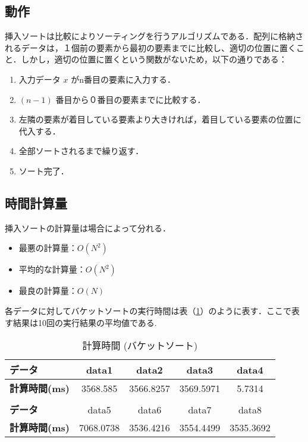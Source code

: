 \documentclass[a4j, titlepage]{jarticle}
\begin{document}
        \subsection{動作}
            挿入ソートは比較によりソーティングを行うアルゴリズムである．配列に格納されるデータは，１個前の要素から最初の要素までに比較し、適切の位置に置くこと．しかし，適切の位置に置くという関数がないため，以下の通りである：
            
            \begin{enumerate}
                \item 入力データ $x$ がn番目の要素に入力する．
                \item $(n-1)$ 番目から０番目の要素までに比較する．
                \item 左隣の要素が着目している要素より大きければ，着目している要素の位置に代入する．
                \item 全部ソートされるまで繰り返す．
                \item ソート完了．
            \end{enumerate}
        
        \subsection{時間計算量}
            挿入ソートの計算量は場合によって分れる．
            \begin{itemize}
                \item 最悪の計算量：$O(N^2)$
                \item 平均的な計算量：$O(N^2)$
                \item 最良の計算量：$O(N)$
            \end{itemize}

            各データに対してバケットソートの実行時間は表（\ref{tab:insertion}）のように表す．ここで表す結果は10回の実行結果の平均値である.

            \begin{table}[tbh]
                \caption{計算時間 (バケットソート)}
                \label{tab:insertion}
                \begin{center}
                    \begin{tabular}{lcccc}
                        \hline
                        \textbf{データ} & data1 & data2 &data3 &data4 \\ \hline
                        \textbf{計算時間(ms)} & 3568.585 & 3566.8257 & 3569.5971 & 5.7314\\ \hline
                        \\ \hline
                        \textbf{データ} & data5 &data6 &data7 &data8\\ \hline
                        \textbf{計算時間(ms)} &7068.0738 & 3536.4216 & 3554.4499 & 3535.3692\\ \hline
                    \end{tabular}
                \end{center}
            \end{table}
        
\end{document}
